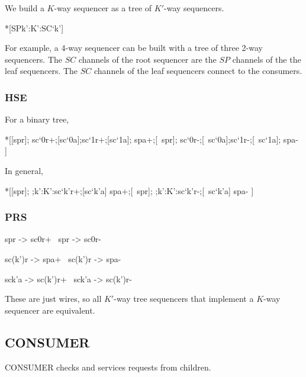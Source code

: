 \documentclass[aer.tex]{subfiles}
\begin{document}
\noindent
We build a $K$-way sequencer as a tree of $K'$-way sequencers.

\begin{csp}
*[SP\*\langle\*k':K':SC`{k'}\rangle]
\end{csp}

\noindent
For example, a 4-way sequencer can be built with a tree of three 2-way sequencers.
The $SC$ channels of the root sequencer are the $SP$ channels of the the leaf 
sequencers. The $SC$ channels of the leaf sequencers connect to the consumers.

\subsubsection*{HSE}

For a binary tree,

\begin{hse}
*[[spr];
  sc`0r+;[sc`0a];sc`1r+;[sc`1a];
  spa+;[~spr];
  sc`0r-;[~sc`0a];sc`1r-;[~sc`1a];
  spa-
 ]
\end{hse}

\noindent
In general,

\begin{hse}
*[[spr];
  \langle;k':K':sc`k'r+;[sc`k'a]\rangle
  spa+;[~spr];
  \langle;k':K':sc`k'r-;[~sc`k'a]\rangle
  spa-
 ]
\end{hse}

\subsubsection*{PRS}

\begin{prs2}
spr -> sc0r+
~spr -> sc0r-

sc(k')r -> spa+
~sc(k')r -> spa-
\end{prs2}

\begin{prs2}
sck'a -> sc(k')r+
~sck'a -> sc(k')r-
\end{prs2}

\noindent
These are just wires, so all $K'$-way tree sequencers that implement a 
$K$-way sequencer are equivalent.

\subsection{CONSUMER}

CONSUMER checks and services requests from children. 
\end{document}

